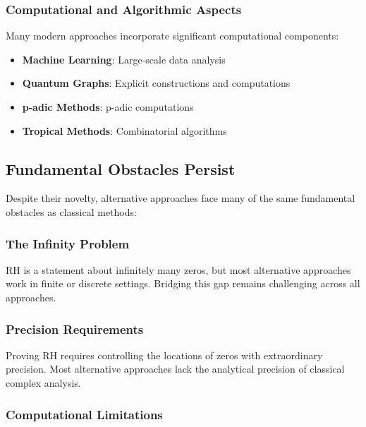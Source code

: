 \subsubsection{Computational and Algorithmic Aspects}

Many modern approaches incorporate significant computational components:

\begin{itemize}
\item \textbf{Machine Learning}: Large-scale data analysis
\item \textbf{Quantum Graphs}: Explicit constructions and computations
\item \textbf{p-adic Methods}: p-adic computations
\item \textbf{Tropical Methods}: Combinatorial algorithms
\end{itemize}

\subsection{Fundamental Obstacles Persist}

Despite their novelty, alternative approaches face many of the same fundamental obstacles as classical methods:

\subsubsection{The Infinity Problem}

\begin{obstacle}
RH is a statement about infinitely many zeros, but most alternative approaches work in finite or discrete settings. Bridging this gap remains challenging across all approaches.
\end{obstacle}

\subsubsection{Precision Requirements}

\begin{obstacle}
Proving RH requires controlling the locations of zeros with extraordinary precision. Most alternative approaches lack the analytical precision of classical complex analysis.
\end{obstacle}

\subsubsection{Computational Limitations}

